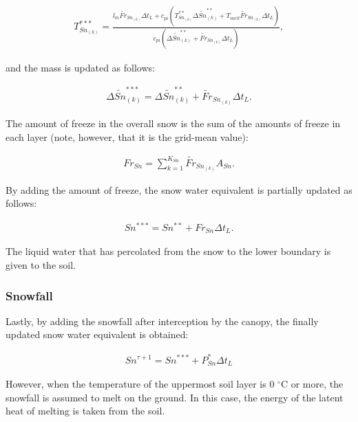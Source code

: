 \begin{eqnarray}
T_{Sn_{(k)}}^{\ast\ast\ast} = \frac{l_m \widetilde{Fr}_{Sn_{(k)}}\Delta t_L
 + c_{pi}(T_{Sn_{(k)}}^{\ast\ast}\Delta \widetilde{Sn}_{(k)}^{\ast\ast}
 + T_{melt} \widetilde{Fr}_{Sn_{(k)}}\Delta t_L)}
 {c_{pi}(\Delta \widetilde{Sn}_{(k)}^{\ast\ast} + \widetilde{Fr}_{Sn_{(k)}}\Delta t_L)}, \label{8-25}
\end{eqnarray}

and the mass is updated as follows:

\begin{eqnarray}
 \Delta \widetilde{Sn}_{(k)}^{\ast\ast\ast} = \Delta \widetilde{Sn}_{(k)}^{\ast\ast} + \widetilde{Fr}_{Sn_{(k)}}\Delta t_L. \label{8-26}
\end{eqnarray}

The amount of freeze in the overall snow is the sum of the amounts of freeze in each layer (note, however, that it is the grid-mean value):

\begin{eqnarray}
 Fr_{Sn} = \sum_{k=1}^{K_{Sn}} \widetilde{Fr}_{Sn_{(k)}} A_{Sn}. \label{8-27}
\end{eqnarray}

By adding the amount of freeze, the snow water equivalent is partially updated as follows:

\begin{eqnarray}
 Sn^{\ast\ast\ast} = Sn^{\ast\ast} + Fr_{Sn} \Delta t_L. \label{8-28}
\end{eqnarray}

The liquid water that has percolated from the snow to the lower boundary is given to the soil.

\hypertarget{snowfall}{%
\subsubsection{Snowfall}\label{snowfall}}

Lastly, by adding the snowfall after interception by the canopy, the finally updated snow water equivalent is obtained:

\begin{eqnarray}
 Sn^{\tau+1} = Sn^{\ast\ast\ast} + P_{Sn}^{\ast} \Delta t_L \label{8-29}
\end{eqnarray}

However, when the temperature of the uppermost soil layer is 0 \(^\circ\mathrm{C}\) or more, the snowfall is assumed to melt on the ground. In this case, the energy of the latent heat of melting is
taken from the soil.

